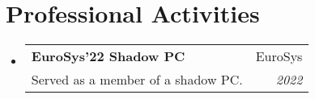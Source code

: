 \documentclass[letterpaper,11pt]{article}
\makeatletter
\newcommand{\resumeSubheading}[4]{
  \vspace{-1pt}\item
    \begin{tabular*}{0.97\textwidth}[t]{l@{\extracolsep{\fill}}r}
      \textbf{#1} & #2 \\
      {\small#3} & \textit{\small #4} \\
    \end{tabular*}\vspace{-5pt}
}
\newcommand{\resumeSubHeadingListStart}{\begin{itemize}[leftmargin=*]}
\newcommand{\resumeSubHeadingListEnd}{\end{itemize}}
\makeatother
\begin{document}
\section{Professional Activities}
\resumeSubHeadingListStart
\resumeSubheading{EuroSys'22 Shadow PC}{EuroSys}{Served as a member of a shadow PC.}{2022}
\resumeSubHeadingListEnd


\end{document}
